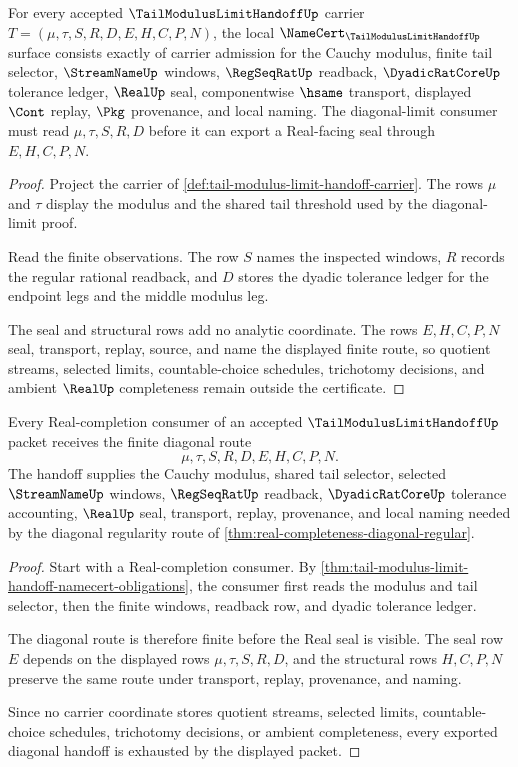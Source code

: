 \begin{theorem}
\label{thm:tail-modulus-limit-handoff-namecert-obligations}
For every accepted $\TailModulusLimitHandoffUp$ carrier $T=(\mu,\tau,S,R,D,E,H,C,P,N)$, the local $\NameCert_{\TailModulusLimitHandoffUp}$ surface consists exactly of carrier admission for the Cauchy modulus, finite tail selector, $\StreamNameUp$ windows, $\RegSeqRatUp$ readback, $\DyadicRatCoreUp$ tolerance ledger, $\RealUp$ seal, componentwise $\hsame$ transport, displayed $\Cont$ replay, $\Pkg$ provenance, and local naming. The diagonal-limit consumer must read $\mu,\tau,S,R,D$ before it can export a Real-facing seal through $E,H,C,P,N$.
\end{theorem}
\begin{proof}
Project the carrier of \autoref{def:tail-modulus-limit-handoff-carrier}. The rows $\mu$ and $\tau$ display the modulus and the shared tail threshold used by the diagonal-limit proof.

Read the finite observations. The row $S$ names the inspected windows, $R$ records the regular rational readback, and $D$ stores the dyadic tolerance ledger for the endpoint legs and the middle modulus leg.

The seal and structural rows add no analytic coordinate. The rows $E,H,C,P,N$ seal, transport, replay, source, and name the displayed finite route, so quotient streams, selected limits, countable-choice schedules, trichotomy decisions, and ambient $\RealUp$ completeness remain outside the certificate.
\end{proof}

\begin{theorem}
\label{thm:tail-modulus-limit-handoff-diagonal-handoff}
Every Real-completion consumer of an accepted $\TailModulusLimitHandoffUp$ packet receives the finite diagonal route
$$
\mu,\tau,S,R,D,E,H,C,P,N .
$$
The handoff supplies the Cauchy modulus, shared tail selector, selected $\StreamNameUp$ windows, $\RegSeqRatUp$ readback, $\DyadicRatCoreUp$ tolerance accounting, $\RealUp$ seal, transport, replay, provenance, and local naming needed by the diagonal regularity route of \autoref{thm:real-completeness-diagonal-regular}.
\end{theorem}
\begin{proof}
Start with a Real-completion consumer. By \autoref{thm:tail-modulus-limit-handoff-namecert-obligations}, the consumer first reads the modulus and tail selector, then the finite windows, readback row, and dyadic tolerance ledger.

The diagonal route is therefore finite before the Real seal is visible. The seal row $E$ depends on the displayed rows $\mu,\tau,S,R,D$, and the structural rows $H,C,P,N$ preserve the same route under transport, replay, provenance, and naming.

Since no carrier coordinate stores quotient streams, selected limits, countable-choice schedules, trichotomy decisions, or ambient completeness, every exported diagonal handoff is exhausted by the displayed packet.
\end{proof}

